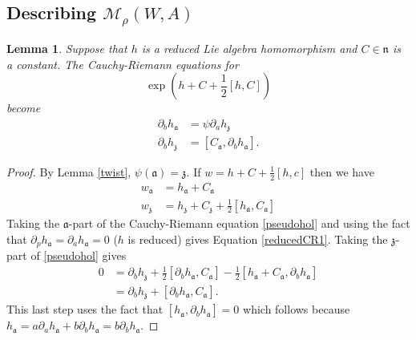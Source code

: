 \documentclass[11pt]{amsart}
\newcommand{\mM}{\mathcal{M}}
\newcommand{\WW}{W}
\newcommand{\nn}{\mathfrak{n}}
\renewcommand{\aa}{\mathfrak{a}}
\newcommand{\zz}{\mathfrak{z}}
\numberwithin{equation}{section}
\newtheorem{lma}[equation]{Lemma}
\theoremstyle{definition}
\theoremstyle{remark}
\begin{document}
\subsection{Describing $\mM_{\rho}(\WW,A)$}

\begin{lma}\label{redeq}
Suppose that $h$ is a reduced Lie algebra homomorphism and $C\in\nn$ is a constant. The Cauchy-Riemann equations for
\[\exp\left(h+C+\frac{1}{2}[h,C]\right)\]
become
\begin{align}
\label{reducedCR1}\partial_bh_{\aa}&=\psi\partial_ah_{\zz}\\
\label{reducedCR2}\partial_bh_{\zz}&=[C_{\aa},\partial_bh_{\aa}].
\end{align}
\end{lma}
\begin{proof}
By Lemma \ref{twist}, $\psi(\aa)=\zz$. If $w=h+C+\frac{1}{2}[h,c]$ then we have
\begin{align*}
w_{\aa}&=h_{\aa}+C_{\aa}\\
w_{\zz}&=h_{\zz}+C_{\zz}+\frac{1}{2}[h_{\aa},C_{\aa}]
\end{align*}
Taking the $\aa$-part of the Cauchy-Riemann equation \eqref{pseudohol} and using the fact that $\partial_ph_{\aa}=\partial_ah_{\aa}=0$ ($h$ is reduced) gives Equation \eqref{reducedCR1}. Taking the $\zz$-part of \eqref{pseudohol} gives
\begin{align*}0&=\partial_bh_{\zz}+\frac{1}{2}[\partial_bh_{\aa},C_{\aa}]-\frac{1}{2}[h_{\aa}+C_{\aa},\partial_bh_{\aa}]\\
&=\partial_bh_{\zz}+[\partial_bh_{\aa},C_{\aa}].\end{align*}
This last step uses the fact  that $[h_{\aa},\partial_bh_{\aa}]=0$ which follows because $h_{\aa}=a\partial_ah_{\aa}+b\partial_bh_{\aa}=b\partial_bh_{\aa}$.
\end{proof}
\end{document}
